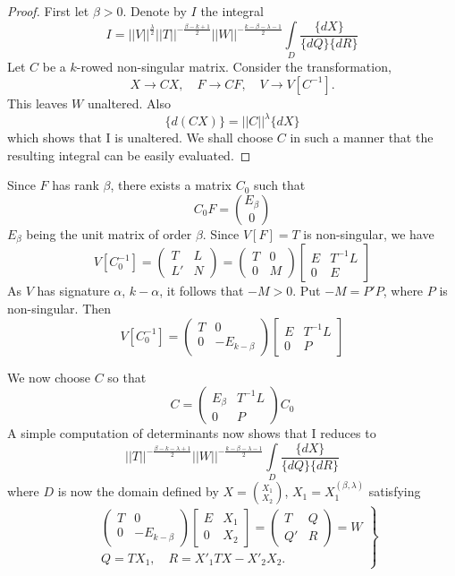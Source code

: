 \begin{proof}
First let $\beta>0$. Denote by $I$ the integral
$$
I=||V||^{\frac{\lambda}{2}}||T||^{-\frac{\beta-k+1}{2}}||W||^{-\frac{k-\beta-\lambda-1}{2}}\int\limits_{D}\frac{\{dX\}}{\{dQ\}\{dR\}} 
$$
Let $C$ be a $k$-rowed non-singular matrix. Consider the
transformation,
$$
X\to CX,\quad F\to CF,\quad V\to V[C^{-1}].
$$
This leaves $W$ unaltered. Also
$$
\{d(CX)\}=||C||^{\lambda}\{dX\}
$$
which shows that I is unaltered. We shall choose $C$ in such a manner
that the resulting integral can be easily evaluated.
\end{proof}

Since $F$ has rank $\beta$, there exists a matrix $C_{0}$ such that
$$
C_{0}F=\binom{E_{\beta}}{0}
$$
$E_{\beta}$ being the unit matrix of order $\beta$. Since $V[F]=T$ is
non-singular, we have
$$
V[C^{-1}_{0}]=
\begin{pmatrix}
T & L\\
L' & N
\end{pmatrix}
=
\begin{pmatrix}
T & 0\\
0 & M
\end{pmatrix}
\begin{bmatrix}
E & T^{-1}L\\
0 & E
\end{bmatrix}
$$
As $V$ has signature $\alpha$, $k-\alpha$, it follows that $-M>0$. Put
$-M=P'P$, where $P$ is non-singular. Then 
$$
V[C^{-1}_{0}]=
\begin{pmatrix}
T & 0\\
0 & -E_{k-\beta}
\end{pmatrix}
\begin{bmatrix}
E & T^{-1}L\\
0 & P
\end{bmatrix}
$$

We now choose $C$ so that 
$$
C=
\begin{pmatrix}
E_{\beta} & T^{-1}L\\
0 & P
\end{pmatrix}
C_{0}
$$\pageoriginale
A simple computation of determinants now shows that I reduces to
$$
||T||^{-\frac{\beta-k-\lambda+1}{2}}||W||^{-\frac{k-\beta-\lambda-1}{2}}\int\limits_{D}
\frac{\{dX\}}{\{dQ\}\{dR\}} 
$$
where $D$ is now the domain defined by $X=\binom{X_{1}}{X_{2}}$,
$X_{1}=X_{1}^{(\beta,\lambda)}$ satisfying
\begin{equation*}
\left.
\begin{aligned}
& \begin{pmatrix}
    T & 0\\
    0 & -E_{k-\beta}
  \end{pmatrix}
  \begin{bmatrix}
    E & X_{1}\\
    0 & X_{2}
  \end{bmatrix}=
  \begin{pmatrix}
    T & Q\\
    Q' & R
  \end{pmatrix}
=W\\
& Q=TX_{1},\quad R=X'_{1}TX-X'_{2}X_{2}.
\end{aligned}
\right\}\tag{89}\label{c4:eq89}
\end{equation*}

